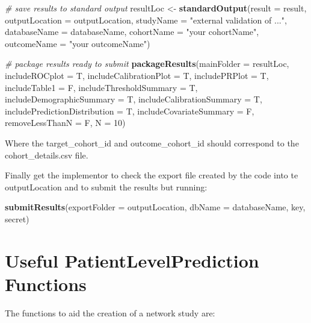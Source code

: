 \documentclass[]{article}
\newenvironment{Shaded}{\begin{snugshade}}{\end{snugshade}}
\newcommand{\KeywordTok}[1]{\textcolor[rgb]{0.13,0.29,0.53}{\textbf{#1}}}
\newcommand{\DataTypeTok}[1]{\textcolor[rgb]{0.13,0.29,0.53}{#1}}
\newcommand{\DecValTok}[1]{\textcolor[rgb]{0.00,0.00,0.81}{#1}}
\newcommand{\StringTok}[1]{\textcolor[rgb]{0.31,0.60,0.02}{#1}}
\newcommand{\CommentTok}[1]{\textcolor[rgb]{0.56,0.35,0.01}{\textit{#1}}}
\newcommand{\NormalTok}[1]{#1}
\begin{document}
\begin{Shaded}
\begin{Highlighting}[]
\CommentTok{# save results to standard output}
\NormalTok{resultLoc <-}\StringTok{ }\KeywordTok{standardOutput}\NormalTok{(}\DataTypeTok{result =}\NormalTok{ result, }\DataTypeTok{outputLocation =}\NormalTok{ outputLocation, }
    \DataTypeTok{studyName =} \StringTok{"external validation of ..."}\NormalTok{, }\DataTypeTok{databaseName =}\NormalTok{ databaseName, }\DataTypeTok{cohortName =} \StringTok{"your cohortName"}\NormalTok{, }
    \DataTypeTok{outcomeName =} \StringTok{"your outcomeName"}\NormalTok{)}

\CommentTok{# package results ready to submit}
\KeywordTok{packageResults}\NormalTok{(}\DataTypeTok{mainFolder =}\NormalTok{ resultLoc, }\DataTypeTok{includeROCplot =}\NormalTok{ T, }\DataTypeTok{includeCalibrationPlot =}\NormalTok{ T, }
    \DataTypeTok{includePRPlot =}\NormalTok{ T, }\DataTypeTok{includeTable1 =}\NormalTok{ F, }\DataTypeTok{includeThresholdSummary =}\NormalTok{ T, }\DataTypeTok{includeDemographicSummary =}\NormalTok{ T, }
    \DataTypeTok{includeCalibrationSummary =}\NormalTok{ T, }\DataTypeTok{includePredictionDistribution =}\NormalTok{ T, }\DataTypeTok{includeCovariateSummary =}\NormalTok{ F, }
    \DataTypeTok{removeLessThanN =}\NormalTok{ F, }\DataTypeTok{N =} \DecValTok{10}\NormalTok{)}
\end{Highlighting}
\end{Shaded}

Where the target\_cohort\_id and outcome\_cohort\_id should correspond
to the cohort\_details.csv file.

Finally get the implementor to check the export file created by the code
into te outputLocation and to submit the results but running:

\begin{Shaded}
\begin{Highlighting}[]
\KeywordTok{submitResults}\NormalTok{(}\DataTypeTok{exportFolder =}\NormalTok{ outputLocation, }\DataTypeTok{dbName =}\NormalTok{ databaseName, key, secret)}
\end{Highlighting}
\end{Shaded}

\section{Useful PatientLevelPrediction
Functions}\label{useful-patientlevelprediction-functions}

The functions to aid the creation of a network study are:
\end{document}
